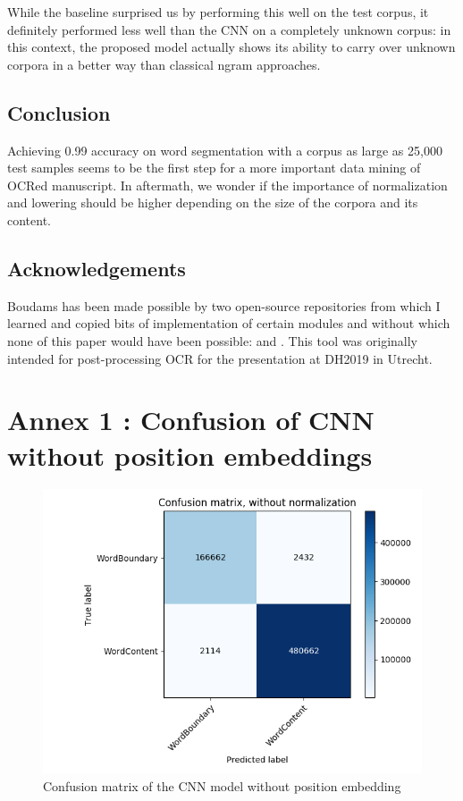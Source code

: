 \documentclass{jdmdh}
\begin{document}
While the baseline surprised us by performing this well on the test corpus, it definitely performed less well than the CNN on a completely unknown corpus: in this context, the proposed model actually shows its ability to carry over unknown corpora in a better way than classical ngram approaches.

\subsection{Conclusion}

Achieving 0.99 accuracy on word segmentation with a corpus as large as 25,000 test samples seems to be the first step for a more important data mining of OCRed manuscript. In aftermath, we wonder if the importance of normalization and lowering should be higher depending on the size of the corpora and its content. 

\subsection{Acknowledgements}

Boudams has been made possible by two open-source repositories from which I learned and copied bits of implementation of certain modules and without which none of this paper would have been possible: \citet{enrique_manjavacas_2019_2654987} and \citet{bentrevett}. This tool was originally intended for post-processing OCR for the presentation \citet{pinchecampsclerice} at DH2019 in Utrecht.






\appendix\footnotesize

\section{Annex 1 : Confusion of CNN without position embeddings}

\begin{figure}[!ht]
  \centering
  \includegraphics[width=\linewidth]{confusion.png}
  \caption{Confusion matrix of the CNN model without position embedding}
  \label{fig:confusion_matrix}
\end{figure}
\end{document}
